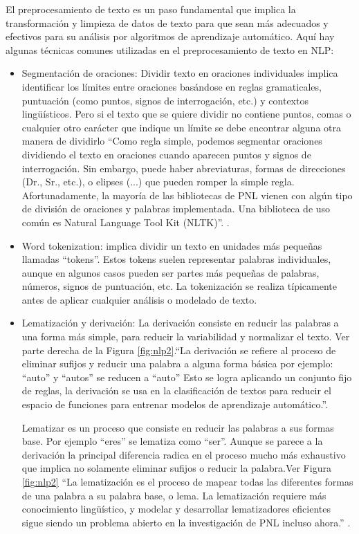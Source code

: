 El preprocesamiento de texto es un paso fundamental que implica la transformación y limpieza de datos de texto para que sean más adecuados y efectivos para su análisis por algoritmos de aprendizaje automático. Aquí hay algunas técnicas comunes utilizadas en el preprocesamiento de texto en NLP:

\begin{itemize}

	\item Segmentación de oraciones: Dividir texto en oraciones individuales implica identificar los límites entre oraciones basándose en reglas gramaticales, puntuación (como puntos, signos de interrogación, etc.) y contextos lingüísticos. Pero si el texto que se quiere dividir no contiene puntos, comas o cualquier otro carácter que indique un límite se debe encontrar alguna otra manera de dividirlo ``Como regla simple, podemos segmentar oraciones dividiendo el texto en oraciones cuando aparecen puntos y signos de interrogación. Sin embargo, puede haber abreviaturas, formas de direcciones (Dr., Sr., etc.), o elipses (...) que pueden romper la simple regla. Afortunadamente, la mayoría de las bibliotecas de PNL vienen con algún tipo de división de oraciones y palabras implementada. Una biblioteca de uso común es Natural Language Tool Kit (NLTK)''. \cite[p.50]{vajjala2020practical}.

	\item Word tokenization: implica dividir un texto en unidades más pequeñas llamadas ``tokens''. Estos tokens suelen representar palabras individuales, aunque en algunos casos pueden ser partes más pequeñas de palabras, números, signos de puntuación, etc. La tokenización se realiza típicamente antes de aplicar cualquier análisis o modelado de texto.

	\item Lematización y derivación: La derivación consiste en reducir las palabras a una forma más simple, para reducir la variabilidad y normalizar el texto. Ver parte derecha de la Figura \ref{fig:nlp2}.``La derivación se refiere al proceso de eliminar sufijos y reducir una palabra a alguna forma básica por ejemplo: ``auto'' y ``autos'' se reducen a ``auto'' Esto se logra aplicando un conjunto fijo de reglas, la derivación se usa en la clasificación de textos para reducir el espacio de funciones para entrenar modelos de aprendizaje automático.''\cite[p. 53]{vajjala2020practical}.


Lematizar es un proceso que consiste en reducir las palabras a sus formas base. Por ejemplo ``eres'' se lematiza como ``ser''. Aunque se parece a la derivación la principal diferencia radica en el proceso mucho más exhaustivo que implica no solamente eliminar sufijos o reducir la palabra.Ver Figura \ref{fig:nlp2} ``La lematización es el proceso de mapear todas las diferentes formas de una palabra a su palabra base, o lema. La lematización requiere más conocimiento lingüístico, y modelar y desarrollar lematizadores eficientes sigue siendo un problema abierto en la investigación de PNL incluso ahora.'' \cite[p. 53]{vajjala2020practical}.


\end{itemize}
